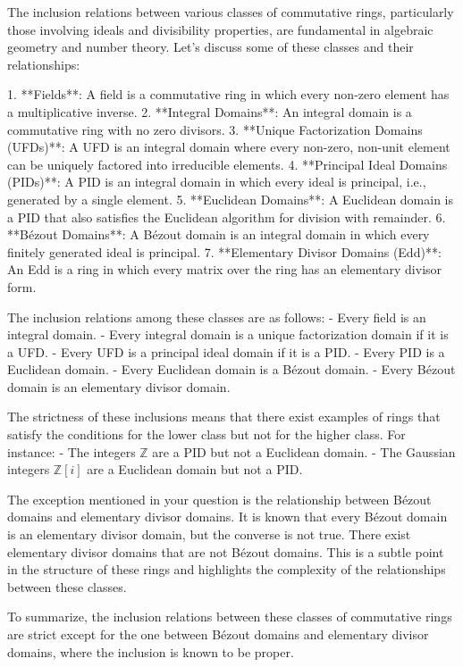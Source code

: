 The inclusion relations between various classes of commutative rings, particularly those involving ideals and divisibility properties, are fundamental in algebraic geometry and number theory. Let's discuss some of these classes and their relationships:

1. **Fields**: A field is a commutative ring in which every non-zero element has a multiplicative inverse.
2. **Integral Domains**: An integral domain is a commutative ring with no zero divisors.
3. **Unique Factorization Domains (UFDs)**: A UFD is an integral domain where every non-zero, non-unit element can be uniquely factored into irreducible elements.
4. **Principal Ideal Domains (PIDs)**: A PID is an integral domain in which every ideal is principal, i.e., generated by a single element.
5. **Euclidean Domains**: A Euclidean domain is a PID that also satisfies the Euclidean algorithm for division with remainder.
6. **Bézout Domains**: A Bézout domain is an integral domain in which every finitely generated ideal is principal.
7. **Elementary Divisor Domains (Edd)**: An Edd is a ring in which every matrix over the ring has an elementary divisor form.

The inclusion relations among these classes are as follows:
- Every field is an integral domain.
- Every integral domain is a unique factorization domain if it is a UFD.
- Every UFD is a principal ideal domain if it is a PID.
- Every PID is a Euclidean domain.
- Every Euclidean domain is a Bézout domain.
- Every Bézout domain is an elementary divisor domain.

The strictness of these inclusions means that there exist examples of rings that satisfy the conditions for the lower class but not for the higher class. For instance:
- The integers \(\mathbb{Z}\) are a PID but not a Euclidean domain.
- The Gaussian integers \(\mathbb{Z}[i]\) are a Euclidean domain but not a PID.

The exception mentioned in your question is the relationship between Bézout domains and elementary divisor domains. It is known that every Bézout domain is an elementary divisor domain, but the converse is not true. There exist elementary divisor domains that are not Bézout domains. This is a subtle point in the structure of these rings and highlights the complexity of the relationships between these classes.

To summarize, the inclusion relations between these classes of commutative rings are strict except for the one between Bézout domains and elementary divisor domains, where the inclusion is known to be proper.